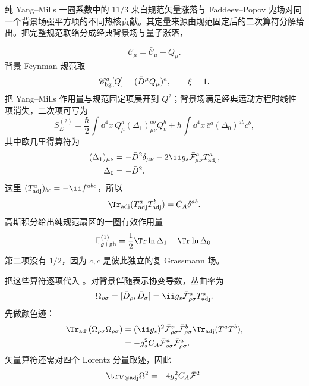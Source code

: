 

\begin{derivation}
纯 Yang--Mills 一圈系数中的 $11/3$ 来自规范矢量涨落与 Faddeev--Popov 鬼场对同一个背景场强平方项的不同热核贡献。其定量来源由规范固定后的二次算符分解给出。把完整规范联络分成经典背景场与量子涨落，

\begin{equation*}
 \mathscr C_\mu=\bar{\mathscr C}_\mu+Q_\mu.
\end{equation*}
背景 Feynman 规范取
\begin{equation*}
 \mathscr C_{\rm bg}^a[Q]=(\bar D^\mu Q_\mu)^a,
 \qquad\xi=1.
\end{equation*}
把 Yang--Mills 作用量与规范固定项展开到 $Q^2$；背景场满足经典运动方程时线性项消失，二次项可写为
\begin{equation*}
 S_E^{(2)}
 =\frac\hbar2\int\dd^4 x\,
 Q_\mu^a(\Delta_1)_{\mu\nu}^{ab}Q_\nu^b
 +\hbar\int\dd^4 x\,
 \bar c^a(\Delta_0)^{ab}c^b,
\end{equation*}
其中欧几里得算符为
\begin{align*}
 (\Delta_1)_{\mu\nu}
 &=-\bar D^2\delta_{\mu\nu}
 -2\ii g_s\bar{\mathcal F}_{\mu\nu}^aT_{\rm adj}^a,\\
 \Delta_0&=-\bar D^2.
\end{align*}
这里 $(T_{\rm adj}^a)_{bc}=-\ii f^{abc}$，所以
\begin{equation*}
 \Tr_{\rm adj}(T_{\rm adj}^aT_{\rm adj}^b)
 =C_A\delta^{ab}.
\end{equation*}
高斯积分给出纯规范扇区的一圈有效作用量
\begin{equation*}
 \Gamma_{g+\rm gh}^{(1)}
 =\frac12\Tr\ln\Delta_1-\Tr\ln\Delta_0.
\end{equation*}
第二项没有 $1/2$，因为 $c,\bar c$ 是彼此独立的复 Grassmann 场。

把这些算符逐项代入 。对背景伴随表示协变导数，丛曲率为
\begin{equation*}
 \Omega_{\rho\sigma}
 =[\bar D_\rho,\bar D_\sigma]
 =\ii g_s\bar{\mathcal F}_{\rho\sigma}^aT_{\rm adj}^a.
\end{equation*}
先做颜色迹：
\begin{align*}
 \Tr_{\rm adj}(\Omega_{\rho\sigma}\Omega_{\rho\sigma})
 &=(\ii g_s)^2
 \bar{\mathcal F}_{\rho\sigma}^a\bar{\mathcal F}_{\rho\sigma}^b
 \Tr_{\rm adj}(T^aT^b),\\
 &=-g_s^2C_A\bar{\mathcal F}_{\rho\sigma}^a
 \bar{\mathcal F}_{\rho\sigma}^a.
\end{align*}
矢量算符还需对四个 Lorentz 分量取迹，因此
\begin{equation*}
 \tr_{V\otimes\rm adj}\Omega^2
 =-4g_s^2C_A\bar{\mathcal F}^2.
\end{equation*}


\end{derivation}
